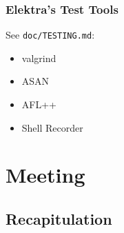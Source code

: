 \begin{frame}[label=test tools]
	\frametitle{Elektra's Test Tools}

	See \texttt{doc/TESTING.md}:

	\begin{itemize}[<+-| alert@+>]
	\item valgrind
	\item ASAN
	\item AFL++
	\item Shell Recorder
	\end{itemize}
\end{frame}

\section{Meeting}

\subsection{Recapitulation}



